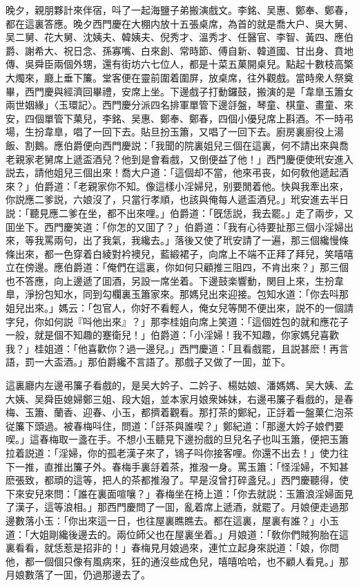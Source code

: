 晚夕，親朋夥計來伴宿，呌了一起海鹽子弟搬演戲文。李銘、吴惠、鄭奉、鄭春，都在這裏答應。晚夕西門慶在大棚内放十五張桌席，為首的就是喬大户、吳大舅、吴二舅、花大舅、沈姨夫、韓姨夫、倪秀才、溫秀才、任醫官、李智、黃四、應伯爵、謝希大、祝日念、孫寡嘴、白來創、常時節、傅自新、韓道國、甘出身、賁地傳、吳舜臣兩個外甥，還有街坊六七位人，都是十菜五菓開桌兒。點起十數枝高檠大燭來，廳上垂下簾。堂客便在靈前圍着圍屏，放桌席，往外觀戲。當時衆人祭奠畢，西門慶與經濟回畢禮，安席上坐。下邊戲子打動鑼鼓，搬演的是「韋臯玉簫女兩世姻緣」〈玉環記〉。西門慶分派四名排軍單管下邊㧱盤，琴童、棋童、畫童、來安，四個單管下菓兒，李銘、吴惠、鄭奉、鄭春，四個小優兒席上斟酒。不一時弔場，生扮韋臯，唱了一回下去。貼旦扮玉簫，又唱了一回下去。廚房裏廚役上湯飯、割鵝。應伯爵便向西門慶説：「我聞的院裏姐兒三個在這裏，何不請出來與喬老親家老舅席上遞盃酒兒？他到是會看戲，又倒便益了他！」西門慶便使玳安進入説去，請他姐兒三個出來！喬大户道：「這個却不當，他來弔丧，如何敎他遞起酒來？」伯爵道：「老親家你不知。像這樣小淫婦兒，别要閒着他。快與我牽出來，你説應二爹説，六娘沒了，只當行孝順，也該與俺每人遞盃酒兒。」玳安進去半日説：「聽見應二爹在坐，都不出來哩。」伯爵道：「旣恁説，我去罷。」走了兩步，又囬坐下。西門慶笑道：「你怎的又囬了？」伯爵道：「我有心待要扯那三個小淫婦出來，等我罵兩句，出了我氣，我纔去。」落後又使了玳安請了一遍，那三個纔慢條條出來，都一色穿着白綾對衿襖兒，藍緞裙子，向席上不端不正拜了拜兒，笑嘻嘻立在傍邊。應伯爵道：「俺們在這裏，你如何只顧推三阻四，不肯出來？」那三個也不答應，向上邊遞了囬酒，另設一席坐着。下邊鼓楽響動，関目上來，生扮韋臯，淨扮包知水，同到勾欄裏玉簫家來。那媽兒出來迎接。包知水道：「你去呌那姐兒出來。」媽云：「包官人，你好不看輕人，俺女兒等閒不便出來，説不的一個請字兒，你如何説『呌他出來』？」那李桂姐向席上笑道：「這個姓包的就和應花子一般，就是個不知趣的蹇衛兒！」伯爵道：「小淫婦！我不知趣，你家媽兒喜歡我？」桂姐道：「他喜歡你？過一邊兒。」西門慶道：「且看戲罷，且説甚麽！再言語，罰一大盃酒。」那伯爵纔不言語了。那戲子又做了一囬，並下。

這裏廳内左邊弔簾子看戲的，是吴大妗子、二妗子、楊姑娘、潘媽媽、吴大姨、孟大姨、吴舜臣媳婦鄭三姐、段大姐，並本家月娘衆姊妹，右邊弔簾子看戲的，是春梅、玉簫、蘭香、迎春、小玉，都擠着觀看。那打茶的鄭紀，正㧱着一盤菓仁泡茶従簾下頭過。被春梅呌住，問道：「㧱茶與誰喫？」鄭紀道：「那邊大妗子娘們要喫。」這春梅取一盞在手。不想小玉聽見下邊扮戲的旦兒名子也叫玉簫，便把玉簫拉着説道：「淫婦，你的孤老漢子來了，鴇子呌你接客哩。你還不出去！」使力往下一推，直推出簾子外。春梅手裏㧱着茶，推潑一身。罵玉簫：「怪淫婦，不知甚麽張致，都頑的這等，把人的茶都推潑了。早是沒曾打碎盞兒。」西門慶聽得，使下來安兒來問：「誰在裏面喧嚷？」春梅坐在椅上道：「你去就説：玉簫浪淫婦面見了漢子，這等浪相。」那西門慶問了一囬，亂着席上遞酒，就罷了。月娘便走過那邊數落小玉：「你出來這一日，也往屋裏瞧瞧去。都在這裏，屋裏有誰？」小玉道：「大姐剛纔後邊去的。兩位師父也在屋裏坐着。」月娘道：「敎你們賊狗胎在這裏看看，就恁惹是招非的！」春梅見月娘過來，連忙立起身來説道：「娘，你問他，都一個個只像有風病來，狂的通沒些成色兒，嘻嘻哈哈，也不顧人看見。」那月娘數落了一囬，仍過那邊去了。

